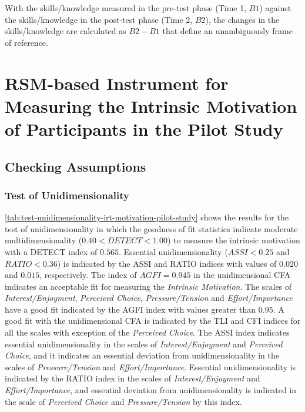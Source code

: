 With the skills/knowledge measured in the pre-test phase (Time 1, $B1$) against the skills/knowledge in the post-test phase (Time 2, $B2$), the changes in the skills/knowledge are calculated as $B2-B1$ that define an unambiguously frame of reference.


\section{RSM-based Instrument for Measuring the Intrinsic Motivation of Participants in the Pilot Study}
\label{sec:irt-motivation-pilot-study}

\subsection{Checking Assumptions}

\subsubsection*{Test of Unidimensionality}

\autoref{tab:test-unidimensionality-irt-motivation-pilot-study} shows the results for the test of unidimensionality in which the goodness of fit statistics indicate moderate multidimensionality ($0.40 < DETECT < 1.00$) to measure the intrinsic motivation with a DETECT index of $0.565$. Essential unidimensionality ($ASSI < 0.25$ and $RATIO < 0.36$) is indicated by the ASSI and RATIO indices with values of $0.020$ and $0.015$, respectively. The index of $AGFI = 0.945$ in the unidimensional CFA indicates an acceptable fit for measuring the \emph{Intrinsic Motivation}. The scales of \emph{Interest/Enjoyment}, \emph{Perceived Choice}, \emph{Pressure/Tension} and \emph{Effort/Importance} have a good fit indicated by the AGFI index with values greater than $0.95$. A good fit with the unidimensional CFA is indicated by the TLI and CFI indices for all the scales with exception of the \emph{Perceived Choice}. The ASSI index indicates essential unidimensionality in the scales of \emph{Interest/Enjoyment} and \emph{Perceived Choice}, and it indicates an essential deviation from unidimensionality in the scales of \emph{Pressure/Tension} and \emph{Effort/Importance}. Essential unidimensionality is indicated by the RATIO index in the scales of \emph{Interest/Enjoyment} and \emph{Effort/Importance}, and essential deviation from unidimensionality is indicated in the scale of \emph{Perceived Choice} and \emph{Pressure/Tension} by this index.

